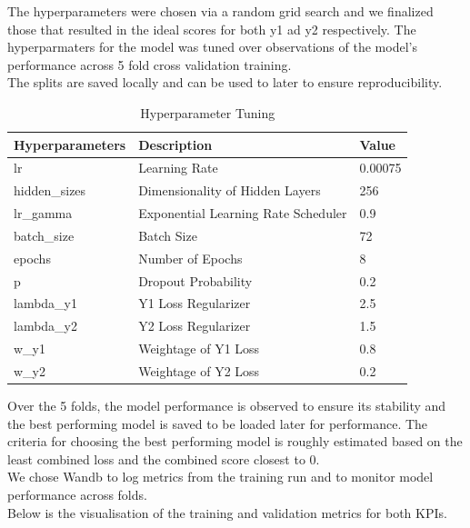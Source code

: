 \documentclass{report} %
\begin{document}
The hyperparameters were chosen via a random grid search and we finalized those that resulted in the ideal scores for both y1 ad y2 respectively.
The hyperparmaters for the model was tuned over observations of the model's performance across 5 fold cross validation training.\\
The splits are saved locally and can be used to later to ensure reproducibility.

\begin{table}[H]
    \centering
    \begin{tabularx}{1\linewidth}{|X|X|X|}
    \hline {\bf Hyperparameters} & {\bf Description} & {\bf Value}\\
    \hline 
    lr & Learning Rate & 0.00075 \\
    hidden\_sizes & Dimensionality of Hidden Layers& 256 \\
    lr\_gamma & Exponential Learning Rate Scheduler & 0.9 \\
    batch\_size & Batch Size & 72 \\
    epochs & Number of Epochs & 8 \\
    p & Dropout Probability& 0.2 \\
    lambda\_y1 & Y1 Loss Regularizer & 2.5 \\
    lambda\_y2 & Y2 Loss Regularizer & 1.5 \\
    w\_y1 & Weightage of Y1 Loss & 0.8 \\
    w\_y2 & Weightage of Y2 Loss & 0.2 \\
    \hline
    \end{tabularx}
    \caption{Hyperparameter Tuning}
    \label{tab:Hyperparameter Tuning}
\end{table}

Over the 5 folds, the model performance is observed to ensure its stability and the best performing model is saved to be loaded later for performance.
The criteria for choosing the best performing model is roughly estimated based on the least combined loss and the combined score closest to 0.\\
We chose \ac{Wandb} to log metrics from the training run and to monitor model performance across folds. \\
Below is the visualisation of the training and validation metrics for both \ac{KPI}s.\\
\end{document}
